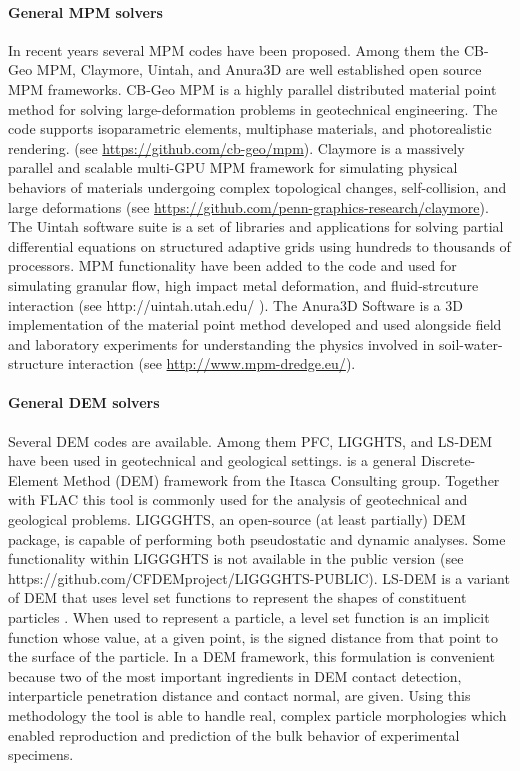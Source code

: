 \paragraph{General MPM solvers}
In recent years several MPM codes have been proposed. Among them the CB-Geo MPM, Claymore, Uintah, and Anura3D are well established open source MPM frameworks. CB-Geo MPM is a highly parallel distributed material point method for solving large-deformation problems in geotechnical engineering. The code supports isoparametric elements, multiphase materials, and photorealistic rendering.
(see 
\url{https://github.com/cb-geo/mpm}). Claymore is a massively parallel and scalable multi-GPU MPM framework for simulating physical behaviors of materials undergoing complex topological changes, self-collision, and large deformations (see \url{https://github.com/penn-graphics-research/claymore}). The Uintah software suite is a set of libraries and applications for solving partial differential equations on structured adaptive grids using hundreds to thousands of processors. MPM functionality have been added to the code and used for simulating granular flow, high impact metal deformation, and fluid-strcuture interaction (see http://uintah.utah.edu/ ). The Anura3D Software is a 3D implementation of the material point method developed and used alongside field and laboratory experiments for understanding the physics involved in soil-water-structure interaction (see \url{http://www.mpm-dredge.eu/}).

\paragraph{General DEM solvers}
Several DEM codes are available. Among them PFC, LIGGHTS, and LS-DEM have been used in geotechnical and geological settings.
 is a general Discrete-Element Method (DEM) framework from the Itasca Consulting group. Together with FLAC this tool is commonly used for the analysis of geotechnical and geological problems.
LIGGGHTS, an open-source (at least partially) DEM package, is capable of performing both pseudostatic and dynamic analyses. Some functionality within LIGGGHTS is not available in the public version (see https://github.com/CFDEMproject/LIGGGHTS-PUBLIC). LS-DEM is a variant of DEM that uses level set functions to represent the shapes of constituent particles \citep{kawamoto2018}. When used to represent a particle, a level set function is an implicit function whose value, at a given point, is the signed distance from that point to the surface of the particle. In a DEM framework, this formulation is convenient because two of the most important ingredients in DEM contact detection, interparticle penetration distance and contact normal, are given. Using this methodology the tool is able to handle real, complex particle morphologies which enabled reproduction and prediction of the bulk behavior of experimental specimens.

